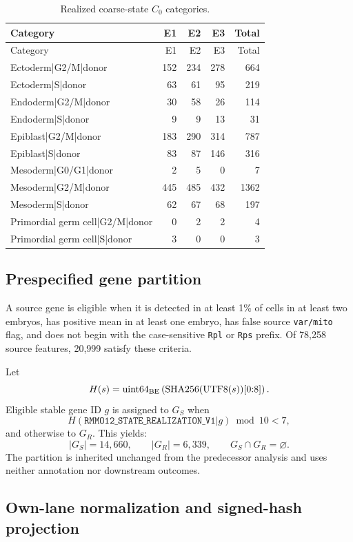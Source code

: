 \documentclass[11pt]{article}
\begin{document}
\begin{longtable}{@{}lrrrr@{}}
\caption{Realized coarse-state \(C_0\) categories.}
\label{tab:C0}\\
\toprule
Category & E1 & E2 & E3 & Total\\
\midrule
\endfirsthead
\toprule
Category & E1 & E2 & E3 & Total\\
\midrule
\endhead
Ectoderm|G2/M|donor&152&234&278&664\\
Ectoderm|S|donor&63&61&95&219\\
Endoderm|G2/M|donor&30&58&26&114\\
Endoderm|S|donor&9&9&13&31\\
Epiblast|G2/M|donor&183&290&314&787\\
Epiblast|S|donor&83&87&146&316\\
Mesoderm|G0/G1|donor&2&5&0&7\\
Mesoderm|G2/M|donor&445&485&432&1362\\
Mesoderm|S|donor&62&67&68&197\\
Primordial germ cell|G2/M|donor&0&2&2&4\\
Primordial germ cell|S|donor&3&0&0&3\\
\bottomrule
\end{longtable}

\subsection{Prespecified gene partition}

A source gene is eligible when it is detected in at least 1\% of cells in at least two embryos, has positive mean in at least one embryo, has false source \texttt{var/mito} flag, and does not begin with the case-sensitive \texttt{Rpl} or \texttt{Rps} prefix. Of 78,258 source features, 20,999 satisfy these criteria.

Let
\[
H(s)=
\operatorname{uint64}_{\rm BE}
\left(
\operatorname{SHA256}(\operatorname{UTF8}(s))[0{:}8]
\right).
\]
Eligible stable gene ID \(g\) is assigned to \(G_S\) when
\[
H(\texttt{RMMO12\_STATE\_REALIZATION\_V1}|g)\bmod 10<7,
\]
and otherwise to \(G_R\). This yields:
\[
|G_S|=14{,}660,\qquad |G_R|=6{,}339,\qquad G_S\cap G_R=\varnothing.
\]
The partition is inherited unchanged from the predecessor analysis and uses neither annotation nor downstream outcomes.

\subsection{Own-lane normalization and signed-hash projection}
\end{document}
